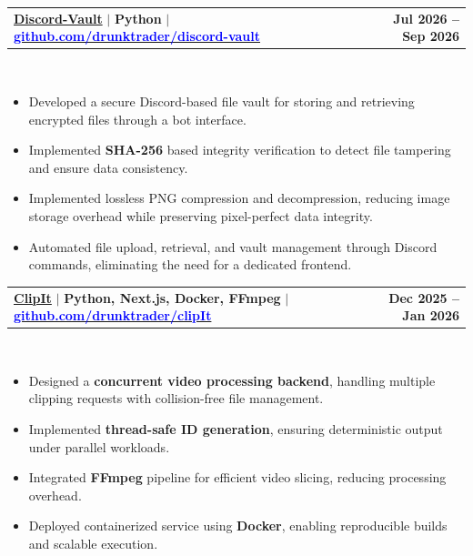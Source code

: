 \documentclass[letterpaper,10pt]{article}
\makeatletter
\newcommand{\resumeItem}[1]{
  \item\small{
    {#1 \vspace{-5pt}}
  }
}
\newcommand{\resumeProjectHeading}[2]{
    \item
    \begin{tabular*}{1.001\textwidth}{l@{\extracolsep{\fill}}r}
      \small#1 & \textbf{\small #2}\\
    \end{tabular*}\vspace{-12pt}
}
\newcommand{\resumeItemListStart}{\begin{itemize}}
\newcommand{\resumeItemListEnd}{\end{itemize}\vspace{-5pt}}
\makeatother
\begin{document}
    \resumeProjectHeading
    {\textbf{\normalsize{\underline{Discord-Vault}}} $|$ \footnotesize{\textbf{Python}} $|$ \href{https://github.com/drunktrader/discord-vault}{\textcolor{blue}{\textbf{github.com/drunktrader/discord-vault}}}}{Jul 2026 -- Sep 2026}\\
    \vspace{8pt}
    \resumeItemListStart
      \vspace{2pt}
      \resumeItem{Developed a secure Discord-based file vault for storing and retrieving encrypted files through a bot interface.}
      \vspace{2pt}
      \resumeItem{Implemented \textbf{SHA-256} based integrity verification to detect file tampering and ensure data consistency.}
      \vspace{2pt}
      \resumeItem{Implemented lossless PNG compression and decompression, reducing image storage overhead while preserving pixel-perfect data integrity.}
      \vspace{2pt}
      \resumeItem{Automated file upload, retrieval, and vault management through Discord commands, eliminating the need for a dedicated frontend.}
      \vspace{2pt}    
    \resumeItemListEnd
    \vspace{-16pt}

    \resumeProjectHeading
    {\textbf{\normalsize{\underline{ClipIt}}} $|$ \footnotesize{\textbf{Python, Next.js, Docker, FFmpeg}} $|$ \href{https://github.com/DrunkTrader/clipIt}{\textcolor{blue}{\textbf{github.com/drunktrader/clipIt}}}}{Dec 2025 -- Jan 2026}\\
    \vspace{8pt}
    \resumeItemListStart
      \vspace{2pt}
      \resumeItem{Designed a \textbf{concurrent video processing backend}, handling multiple clipping requests with collision-free file management.}
      \vspace{2pt}
      \resumeItem{Implemented \textbf{thread-safe ID generation}, ensuring deterministic output under parallel workloads.}
      \vspace{2pt}
      \resumeItem{Integrated \textbf{FFmpeg} pipeline for efficient video slicing, reducing processing overhead.}
      \vspace{2pt}
      \resumeItem{Deployed containerized service using \textbf{Docker}, enabling reproducible builds and scalable execution.}
      \vspace{2pt}
    \resumeItemListEnd
    \vspace{-6pt}
\end{document}
